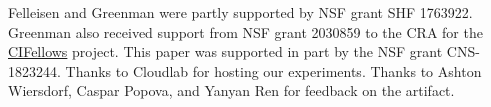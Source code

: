 
\begin{acks}
Felleisen and Greenman were partly supported by NSF grant SHF
1763922.
Greenman also received support from NSF grant 2030859 to the CRA for the
\href{https://cifellows2020.org}{CIFellows} project.
This paper was supported in part by the NSF grant CNS-1823244.
Thanks to Cloudlab for hosting our experiments.
Thanks to Ashton Wiersdorf, Caspar Popova, and Yanyan Ren for feedback on the artifact.


\end{acks}
